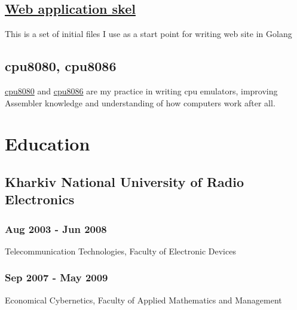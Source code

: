 \documentclass[letterpaper]{article}
\begin{document}
\subsection{\href{https://github.com/AlexJakeGreen/bars}{Web application skel}}
\label{sec-3-2}
This is a set of initial files I use as a start point for writing web site in Golang
\subsection{cpu8080, cpu8086}
\label{sec-3-3}
\href{https://github.com/AlexJakeGreen/cpu8080}{cpu8080} and \href{https://github.com/AlexJakeGreen/cpu8086}{cpu8086} are my practice in writing cpu emulators, improving Assembler knowledge and understanding of how computers work after all.
\section{Education}
\label{sec-4}
\subsection{Kharkiv National University of Radio Electronics}
\label{sec-4-1}
\subsubsection{Aug 2003 - Jun 2008}
\label{sec-4-1-1}
Telecommunication Technologies, Faculty of Electronic Devices
\subsubsection{Sep 2007 - May 2009}
\label{sec-4-1-2}
Economical Cybernetics, Faculty of Applied Mathematics and Management
\end{document}

